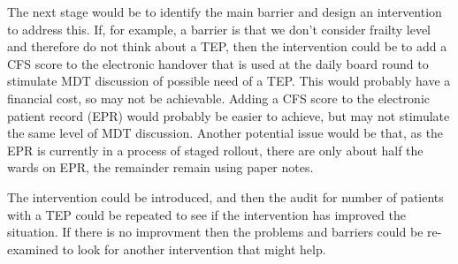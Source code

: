 \documentclass[12pt,a4paper,oneside,titlepage]{article}
\begin{document}
The next stage would be to identify the main barrier and design an intervention to
address this. If, for example, a barrier is that we don't consider frailty level and
therefore do not think about a TEP, then the intervention could be to add a CFS score
to the electronic handover that is used at the daily board round to stimulate MDT
discussion of possible need of a TEP. This would probably have a financial cost, so
may not be achievable. Adding a CFS score to the electronic patient record (EPR) would 
probably be easier to achieve, but may not stimulate the same level of MDT discussion.
Another potential issue would be that, as the EPR is currently in a process of staged 
rollout, there are only about half the wards on EPR, the remainder remain using paper notes.

The intervention could be introduced, and then the audit for number of patients with 
a TEP could be repeated to see if the intervention has improved the situation. If there 
is no improvment then the problems and barriers could be re-examined to look for another
intervention that might help.

\clearpage
\printbibliography[prenote=needsfixing]
\end{document}
